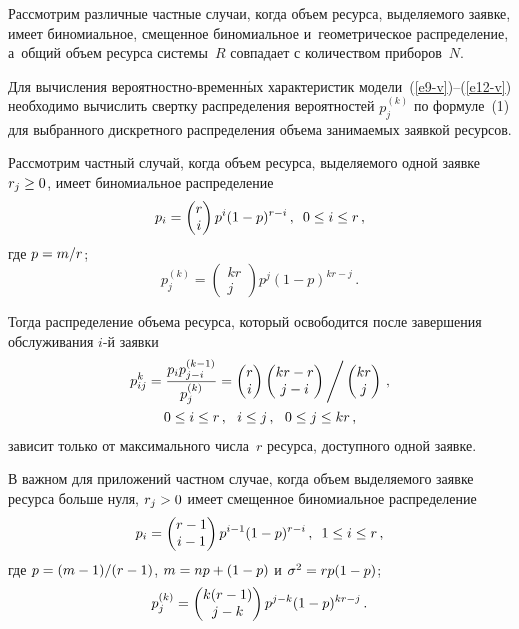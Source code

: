 \begin{multicols}{2}
  Рассмотрим различные частные случаи, когда объем ресурса, выделяемого 
заявке, имеет биномиальное, смещенное биномиальное и~геометрическое 
распределение, а~общий объем ресурса сис\-те\-мы~$R$ совпадает с количеством 
приборов~$N$.
   
  Для вычисления вероят\-ност\-но-вре\-мен\-н$\acute{\mbox{ы}}$х характеристик  
модели~(\ref{e9-v})--(\ref{e12-v}) необходимо вы\-чис\-лить свертку 
распределения вероятностей $p_j^{(k)}$ по формуле~(1) для выбранного 
дискретного распределения объема занимаемых заявкой ресурсов.
  
  Рассмотрим частный случай, когда объем ресурса, выделяемого одной заявке 
$r_j\hm\geq 0$, имеет биномиальное распределение 
$$
p_i= \begin{pmatrix}
r\\ 
i\end{pmatrix} p^i(1-p)^{r-i}\,,\enskip 
0\leq i\leq r\,,
$$
 где $p\hm= m/r$;
$$
p_j^{(k)} = \begin{pmatrix} 
kr\\ j\end{pmatrix} p^j (1- p)^{kr-j}\,.
$$ 

Тогда 
распределение объема ресурса, который освободится после завершения 
обслуживания $i$-й заявки 
\begin{multline*}
p_{ij}^k\hm= \fr{p_i p_{j-i}^{(k-1)}}{p_j^{(k)}} = 
\begin{pmatrix}r\\i\end{pmatrix}\begin{pmatrix} kr-r\\ j-i\end{pmatrix}\Bigg/ 
\begin{pmatrix} kr\\ j\end{pmatrix}\,,\\ 0\leq i\leq r\,,\ \ i\leq j\,,\ \ 0\leq 
j\leq kr\,,
\end{multline*}
 зависит только от максимального числа~$r$ ресурса, доступного 
одной заявке.
  
  В важном для приложений частном случае, когда объем выделяемого заявке 
ресурса больше нуля, $r_j\hm>0$ имеет смещенное биномиальное 
распределение 
$$
p_i\hm= \begin{pmatrix} r-1\\ i-1\end{pmatrix} p^{i-1}(1-p)^{r-i}\,,\enskip 
1\leq i\leq r\,,
$$
где $p\hm=(m\hm-1)/(r\hm-1)$, $m\hm= np\hm+ (1\hm-p)$ 
и $\sigma^2\hm= rp(1\hm-p)$;
$$
p_j^{(k)}\hm= \begin{pmatrix} k(r-1)\\ j-
k\end{pmatrix} p^{j-k} (1\hm-p)^{kr-j}\,.
$$


\end{multicols}
